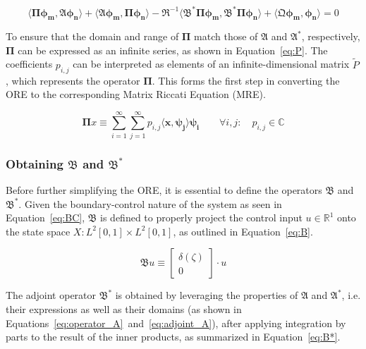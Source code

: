 \begin{equation} \label{eq:ORE_2}
    \langle \mathbf{\Pi} \bm{\phi_m}, \mathfrak{A} \bm{\phi_n} \rangle
    + \langle \mathfrak{A} \bm{\phi_m}, \mathbf{\Pi} \bm{\phi_n} \rangle
    - \mathfrak{R}^{-1} \langle \mathfrak{B}^* \mathbf{\Pi} \bm{\phi_m}, \mathfrak{B}^* \mathbf{\Pi} \bm{\phi_n} \rangle 
    + \langle \mathfrak{Q} \bm{\phi_m}, \bm{\phi_n} \rangle = 0
\end{equation}

To ensure that the domain and range of $\mathbf{\Pi}$ match those of $\mathfrak{A}$ and $\mathfrak{A}^*$, respectively, $\mathbf{\Pi}$ can be expressed as an infinite series, as shown in Equation~\ref{eq:P}. The coefficients $p_{i,j}$ can be interpreted as elements of an infinite-dimensional matrix $\tilde{P}$, which represents the operator $\mathbf{\Pi}$. This forms the first step in converting the ORE to the corresponding Matrix Riccati Equation (MRE).

\begin{equation} \label{eq:P}
    \mathbf{\Pi} x \equiv \sum_{i=1}^{\infty}\sum_{j=1}^{\infty} p_{i,j} \langle \bm{x}, \bm{\psi_j} \rangle \bm{\psi_i} \qquad
    \forall {i,j}: \quad p_{i,j} \in \mathbb{C}
\end{equation}

\subsubsection{Obtaining $\mathfrak{B}$ and $\mathfrak{B}^*$}

Before further simplifying the ORE, it is essential to define the operators $\mathfrak{B}$ and $\mathfrak{B}^*$. Given the boundary-control nature of the system as seen in Equation~\ref{eq:BC}, $\mathfrak{B}$ is defined to properly project the control input $u \in \mathbb{R}^1$ onto the state space $X: L^2[0,1] \times L^2[0,1]$, as outlined in Equation~\ref{eq:B}.

\begin{equation} \label{eq:B}
    \mathfrak{B} u \equiv
    \begin{bmatrix}
        \delta(\zeta) \\ 0
    \end{bmatrix} \cdot u
\end{equation}

The adjoint operator $\mathfrak{B}^*$ is obtained by leveraging the properties of $\mathfrak{A}$ and $\mathfrak{A}^*$, i.e. their expressions as well as their domains (as shown in Equations~\ref{eq:operator_A}~and~\ref{eq:adjoint_A}), after applying integration by parts to the result of the inner products, as summarized in Equation~\ref{eq:B*}.

